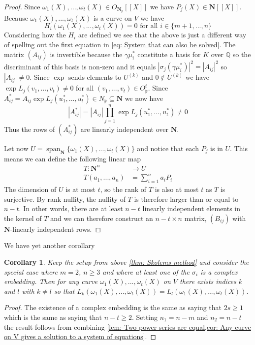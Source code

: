 \documentclass{article}
\newcommand{\Span}{\operatorname{span}}
\newtheorem{corollary}{Corollary}[section]
\newcommand{\mfrak}[1]{\mathfrak{#1}}
\newcommand{\mbb}[1]{\mathbb{#1}}
\numberwithin{equation}{section}
\begin{document}
\begin{proof}
	Since $\omega_1(X), ..., \omega_t(X) \in O_{\bm {N_{\mfrak p}}}[[X]]$ we have $P_j(X) \in \bm N[[X]]$. Because $\omega_1(X), ..., \omega_t(X)$ is a curve on $V$ we have
	\begin{equation}\label{eq: Last reformulation of initial equations}
    	H_i(\omega_1(X), ..., \omega_t(X)) = 0 \text{ for all } i \in \{m+1, ..., n\}
	\end{equation}
	Considering how the $H_i$ are defined we see that the above is just a different way of spelling out the first equation in \cref{eq: System that can also be solved}. The matrix $(A_{ij})$ is invertible because the $\gamma \mu_i^*$ constitute a basis for $K$ over $\mbb{Q}$ so the discriminant of this basis is non-zero and it equals $|\sigma_j(\gamma \mu_i^*)|^2 = |A_{ij}|^2$ so $|A_{ij}| \neq 0$. Since $\exp$ sends elements to $U^{(k)}$ and $0 \notin U^{(k)}$ we have $\exp L_j(v_1, ..., v_t) \neq 0$ for all $(v_1, ..., v_t) \in O_\mfrak p^t$. Since $A_{ij}^* = A_{ij} \exp L_j(u_1^*, ..., u_t^*) \in N_\mfrak p \subseteq \bm N$ we now have
	$$|A_{ij}^*| = |A_{ij}| \prod_{j = 1}^n \exp L_j(u_1^*, ..., u_t^*) \neq 0$$
	Thus the rows of $(A_{ij}^*)$ are linearly independent over $\bm N$.
    
	Let now $U = \Span_{\bm N} \{ \omega_1(X), ..., \omega_t(X) \}$ and notice that each $P_j$ is in $U$. This means we can define the following linear map
	\begin{align*}
    	T : \bm N^n  & \to U                	\\
    	T(a_1, ..., a_n) & = \sum_{i = 1}^n a_i P_i
	\end{align*}
	The dimension of $U$ is at most $t$, so the rank of $T$ is also at most $t$ as $T$ is surjective. By rank nullity, the nullity of $T$ is therefore larger than or equal to $n-t$. In other words, there are at least $n-t$ linearly independent elements in the kernel of $T$ and we can therefore construct an $n-t \times n$ matrix, $(B_{ij})$ with $\bm N$-linearly independent rows.
\end{proof}

We have yet another corollary
\begin{corollary}\label{cor: Result to prove thues theorem}
	Keep the setup from above \cref{thm: Skolems method} and consider the special case where $m = 2$, $n \geq 3$ and where at least one of the $\sigma_i$ is a complex embedding. Then for any curve $\omega_1(X), ..., \omega_t(X)$ on $V$ there exists indices $k$ and $l$ with $k \neq l$ so that $L_k(\omega_1(X), ..., \omega_t(X)) = L_l(\omega_1(X), ..., \omega_t(X))$.
\end{corollary}
\begin{proof}
	The existence of a complex embedding is the same as saying that $2s \geq 1$ which is the same as saying that $n - t \geq 2$. Setting $n_1 = n-m$ and $n_2 = n-t$ the result follows from combining \cref{lem: Two power series are equal,cor: Any curve on V gives a solution to a system of equations}.
\end{proof}
\end{document}
